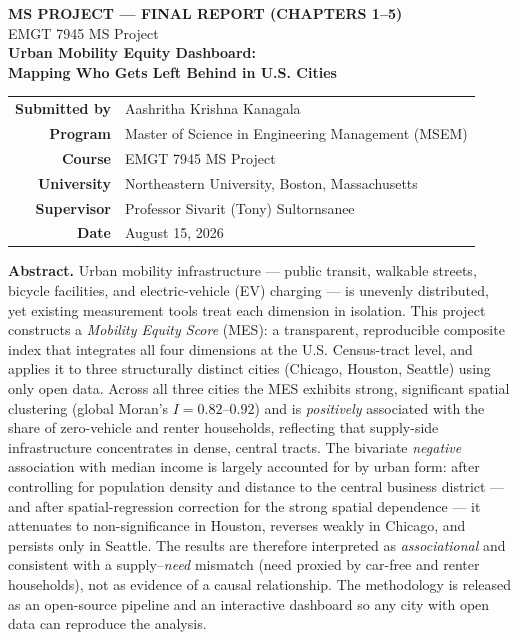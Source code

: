 \documentclass[11pt]{article}
\begin{document}
\thispagestyle{empty}
\begin{center}
{\large\bfseries MS PROJECT --- FINAL REPORT (CHAPTERS 1--5)}\\[2pt]
{\normalsize EMGT 7945 MS Project}\\[18pt]
{\LARGE\bfseries\color{neunavy} Urban Mobility Equity Dashboard:}\\[4pt]
{\Large\bfseries\color{neunavy} Mapping Who Gets Left Behind in U.S. Cities}\\[22pt]
\end{center}

\begin{center}
\renewcommand{\arraystretch}{1.3}
\begin{tabular}{r l}
\textbf{Submitted by} & Aashritha Krishna Kanagala \\
\textbf{Program} & Master of Science in Engineering Management (MSEM) \\
\textbf{Course} & EMGT 7945 MS Project \\
\textbf{University} & Northeastern University, Boston, Massachusetts \\
\textbf{Supervisor} & Professor Sivarit (Tony) Sultornsanee \\
\textbf{Date} & August 15, 2026 \\
\end{tabular}
\end{center}

\vspace{14pt}
\textbf{\color{neunavy} Abstract.}\quad
Urban mobility infrastructure --- public transit, walkable streets, bicycle
facilities, and electric-vehicle (EV) charging --- is unevenly distributed, yet
existing measurement tools treat each dimension in isolation. This project
constructs a \emph{Mobility Equity Score} (MES): a transparent, reproducible
composite index that integrates all four dimensions at the U.S. Census-tract
level, and applies it to three structurally distinct cities (Chicago, Houston,
Seattle) using only open data. Across all three cities the MES exhibits strong,
significant spatial clustering (global Moran's $I = 0.82$--$0.92$) and is
\emph{positively} associated with the share of zero-vehicle and renter
households, reflecting that supply-side infrastructure concentrates in dense,
central tracts. The bivariate \emph{negative} association with median income is
largely accounted for by urban form: after controlling for population density
and distance to the central business district --- and after spatial-regression
correction for the strong spatial dependence --- it attenuates to
non-significance in Houston, reverses weakly in Chicago, and persists only in
Seattle. The results are therefore interpreted as \emph{associational} and
consistent with a supply--\emph{need} mismatch (need proxied by car-free and
renter households), not as evidence of a causal relationship. The methodology is
released as an open-source pipeline and an interactive dashboard so any city with
open data can reproduce the analysis.
\end{document}
